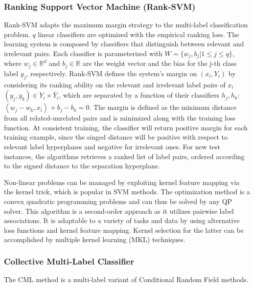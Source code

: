 \documentclass[12pt]{report}
\begin{document}
	\subsubsection*{Ranking Support Vector Machine (Rank-SVM)}
	Rank-SVM adapts the maximum margin strategy to the multi-label classification
  problem. $q$ linear classifiers are optimized with the empirical
  ranking loss. The learning system is composed by classifiers that distinguish
  between relevant and irrelevant pairs. Each classifier is parameterized with $W = \{w_j,b_j | 1 \leq j \leq q\}$, where $w_j \in \mathbb{R}^d$ and $b_j \in \mathbb{R}$ are the weight vector and the bias
	for the j-th class label $y_j$, respectively. Rank-SVM defines the system’s
  margin on $(x_i,Y_i)$ by considering its ranking ability on the relevant and
  irrelevant label pairs of $x_i$ $(y_j,y_k) \in Y_i \times \bar Y_i$, which are
  separated by a function of their classifiers $h_j, h_k$: $\left<w_j-w_k, x_i
  \right> + b_j - b_k=0$. The margin is defined as the minimum distance from all
  related-unrelated pairs and is minimized along with the training loss
  function. At consistent training, the classifier will return positive margin
  for each training example, since the singed distance will be positive with
  respect to relevant label hyperplanes and negative for irrelevant ones.
  For new test instances, the algorithms retrieves a ranked list of label pairs, ordered
  according to the signed distance to the separation hyperplane.
	
	Non-linear problems can be managed by exploiting kernel feature mapping via
  the kernel trick, which is popular in SVM methods. The optimization method is
  a convex quadratic programming problems and can thus be solved by any QP
  solver.
  This algorithm is a second-order approach as it utilizes pairwise label associations.
  It is adaptable to a variety of tasks and data by using alternative loss
  functions and kernel feature mapping. Kernel selection for the latter can be accomplished by
  multiple kernel learning (MKL) techniques.

  \subsubsection*{Collective Multi-Label Classifier}
   The CML method is a multi-label variant of Conditional Random Field methods.
\end{document}
